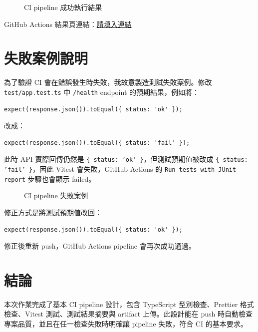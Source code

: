 \documentclass[12pt,a4paper]{article}
\begin{document}
\begin{figure}[H]
  \centering
  \caption{CI pipeline 成功執行結果}
\end{figure}

GitHub Actions 結果頁連結：\url{請填入連結}

\section{失敗案例說明}

為了驗證 CI 會在錯誤發生時失敗，我故意製造測試失敗案例。修改 \texttt{test/app.test.ts} 中 \texttt{/health} endpoint 的預期結果，例如將：

\begin{lstlisting}[style=yamlstyle,language={}]
expect(response.json()).toEqual({ status: 'ok' });
\end{lstlisting}

改成：

\begin{lstlisting}[style=yamlstyle,language={}]
expect(response.json()).toEqual({ status: 'fail' });
\end{lstlisting}

此時 API 實際回傳仍然是 \texttt{\{ status: 'ok' \}}，但測試預期值被改成 \texttt{\{ status: 'fail' \}}，因此 Vitest 會失敗，GitHub Actions 的 \texttt{Run tests with JUnit report} 步驟也會顯示 failed。

\begin{figure}[H]
  \centering
  \caption{CI pipeline 失敗案例}
\end{figure}

修正方式是將測試預期值改回：

\begin{lstlisting}[style=yamlstyle,language={}]
expect(response.json()).toEqual({ status: 'ok' });
\end{lstlisting}

修正後重新 push，GitHub Actions pipeline 會再次成功通過。

\section{結論}

本次作業完成了基本 CI pipeline 設計，包含 TypeScript 型別檢查、Prettier 格式檢查、Vitest 測試、測試結果摘要與 artifact 上傳。此設計能在 push 時自動檢查專案品質，並且在任一檢查失敗時明確讓 pipeline 失敗，符合 CI 的基本要求。
\end{document}
